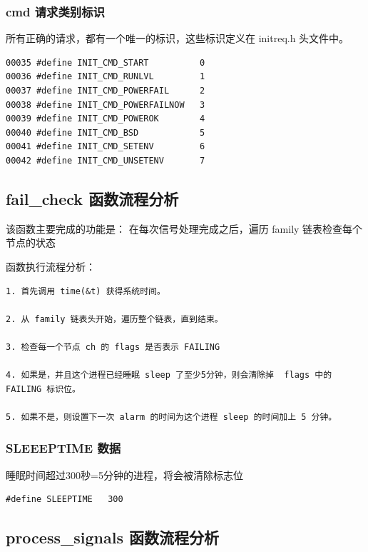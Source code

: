\subsubsection{cmd 请求类别标识}

所有正确的请求，都有一个唯一的标识，这些标识定义在 initreq.h 头文件中。

{\begin{shaded}\begin{verbatim}
00035 #define INIT_CMD_START          0
00036 #define INIT_CMD_RUNLVL         1
00037 #define INIT_CMD_POWERFAIL      2
00038 #define INIT_CMD_POWERFAILNOW   3
00039 #define INIT_CMD_POWEROK        4
00040 #define INIT_CMD_BSD            5
00041 #define INIT_CMD_SETENV         6
00042 #define INIT_CMD_UNSETENV       7
\end{verbatim}\end{shaded}}
\subsection{fail\_check 函数流程分析}

该函数主要完成的功能是： 在每次信号处理完成之后，遍历 family
链表检查每个节点的状态

函数执行流程分析：

{\begin{shaded}\begin{verbatim}
1. 首先调用 time(&t) 获得系统时间。

2. 从 family 链表头开始，遍历整个链表，直到结束。 

3. 检查每一个节点 ch 的 flags 是否表示 FAILING

4. 如果是，并且这个进程已经睡眠 sleep 了至少5分钟，则会清除掉  flags 中的 FAILING 标识位。

5. 如果不是，则设置下一次 alarm 的时间为这个进程 sleep 的时间加上 5 分钟。
\end{verbatim}\end{shaded}}
\subsubsection{SLEEEPTIME 数据}

睡眠时间超过300秒=5分钟的进程，将会被清除标志位

{\begin{shaded}\begin{verbatim}
#define SLEEPTIME   300
\end{verbatim}\end{shaded}}
\subsection{process\_signals 函数流程分析}


